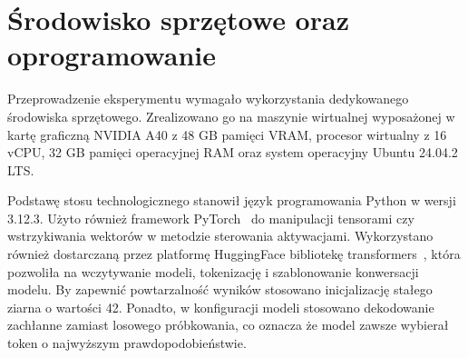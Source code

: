 \section{Środowisko sprzętowe oraz oprogramowanie}
Przeprowadzenie eksperymentu wymagało wykorzystania dedykowanego środowiska sprzętowego. Zrealizowano go na maszynie wirtualnej wyposażonej w kartę graficzną NVIDIA A40 z 48 GB pamięci VRAM, procesor wirtualny z 16 vCPU, 32 GB pamięci operacyjnej RAM oraz system operacyjny Ubuntu 24.04.2 LTS.

Podstawę stosu technologicznego stanowił język programowania Python w wersji 3.12.3. Użyto również framework PyTorch~\cite{paszke2019pytorchimperativestylehighperformance} do manipulacji tensorami czy wstrzykiwania wektorów w metodzie sterowania aktywacjami. Wykorzystano również dostarczaną przez platformę HuggingFace bibliotekę transformers~\cite{wolf2020huggingfacestransformersstateoftheartnatural}, która pozwoliła na wczytywanie modeli, tokenizację i szablonowanie konwersacji modelu. By zapewnić powtarzalność wyników stosowano inicjalizację stałego ziarna o wartości 42. Ponadto, w konfiguracji modeli stosowano dekodowanie zachłanne zamiast losowego próbkowania, co oznacza że model zawsze wybierał token o najwyższym prawdopodobieństwie.